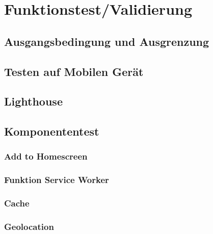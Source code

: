 \chapter{Funktionstest/Validierung}\label{chap:Funktionstest}
\thispagestyle{standard}
\pagestyle{standard}

\section{Ausgangsbedingung und Ausgrenzung}


\section{Testen auf Mobilen Gerät}

\section{Lighthouse}

\section{Komponententest}



\subsection{Add to Homescreen}



\subsection{Funktion Service Worker}



\subsection{Cache}



\subsection{Geolocation}




